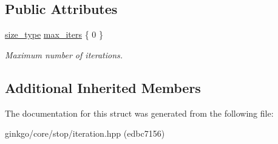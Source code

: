 \subsection*{Public Attributes}
\begin{DoxyCompactItemize}
\item 
\mbox{\label{structgko_1_1stop_1_1Iteration_1_1parameters__type_a7daf7ecb5cf107b9e7444b0898f691c4}} 
\hyperlink{namespacegko_a6e5c95df0ae4e47aab2f604a22d98ee7}{size\+\_\+type} \hyperlink{structgko_1_1stop_1_1Iteration_1_1parameters__type_a7daf7ecb5cf107b9e7444b0898f691c4}{max\+\_\+iters} \{ 0 \}
\begin{DoxyCompactList}\small\item\em Maximum number of iterations. \end{DoxyCompactList}\end{DoxyCompactItemize}
\subsection*{Additional Inherited Members}


The documentation for this struct was generated from the following file\+:\begin{DoxyCompactItemize}
\item 
ginkgo/core/stop/iteration.\+hpp (edbc7156)\end{DoxyCompactItemize}
